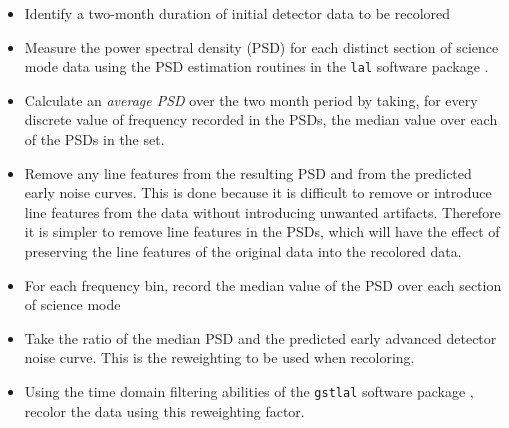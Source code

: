 \documentclass[12pt]{iopart}
\begin{document}
\begin{itemize}
 \item Identify a two-month duration of initial detector data to be 
recolored
 \item Measure the power spectral density (PSD) for each distinct section 
of science mode data using the PSD estimation routines in the \texttt{lal} 
software package \cite{LAL}.
 \item Calculate an \emph{average PSD} over the two month period by taking, for
every discrete value of frequency recorded in the PSDs, the median value over
each of the PSDs in the set.
 \item Remove any line features from the resulting PSD and from the predicted
early noise curves. This is done because it is difficult to remove or introduce 
line features from the data without introducing unwanted artifacts. Therefore 
it is simpler to remove line features in the PSDs, which will have the effect 
of preserving the line features of the original data into the recolored 
data.
 \item For each frequency bin, record the median value of the PSD over each 
section of science mode
 \item Take the ratio of the median PSD and the predicted early advanced
detector noise curve.
 This is the reweighting to be used when recoloring.
 \item Using the time domain filtering abilities of the \texttt{gstlal}
software package \cite{GSTLAL}, recolor the data using this reweighting factor.
\end{itemize}
\end{document}
